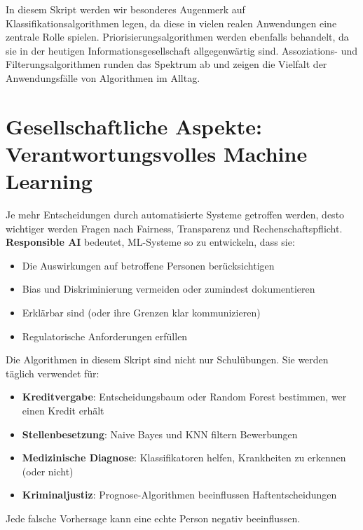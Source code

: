 In diesem Skript werden wir besonderes Augenmerk auf Klassifikationsalgorithmen legen, da diese in vielen realen Anwendungen eine zentrale Rolle spielen. Priorisierungsalgorithmen werden ebenfalls behandelt, da sie in der heutigen Informationsgesellschaft allgegenwärtig sind. Assoziations- und Filterungsalgorithmen runden das Spektrum ab und zeigen die Vielfalt der Anwendungsfälle von Algorithmen im Alltag.


\section{Gesellschaftliche Aspekte: Verantwortungsvolles Machine Learning}

\begin{mydefinition}[Responsible AI]
Je mehr Entscheidungen durch automatisierte Systeme getroffen werden, desto wichtiger werden Fragen nach Fairness, Transparenz und Rechenschaftspflicht. \textbf{Responsible AI} bedeutet, ML-Systeme so zu entwickeln, dass sie:
\begin{itemize}
    \item Die Auswirkungen auf betroffene Personen berücksichtigen
    \item Bias und Diskriminierung vermeiden oder zumindest dokumentieren
    \item Erklärbar sind (oder ihre Grenzen klar kommunizieren)
    \item Regulatorische Anforderungen erfüllen
\end{itemize}
\end{mydefinition}

\begin{myexample}
Die Algorithmen in diesem Skript sind nicht nur Schulübungen. Sie werden täglich verwendet für:
\begin{itemize}
    \item \textbf{Kreditvergabe}: Entscheidungsbaum oder Random Forest bestimmen, wer einen Kredit erhält
    \item \textbf{Stellenbesetzung}: Naive Bayes und KNN filtern Bewerbungen
    \item \textbf{Medizinische Diagnose}: Klassifikatoren helfen, Krankheiten zu erkennen (oder nicht)
    \item \textbf{Kriminaljustiz}: Prognose-Algorithmen beeinflussen Haftentscheidungen
\end{itemize}
Jede falsche Vorhersage kann eine echte Person negativ beeinflussen.
\end{myexample}

